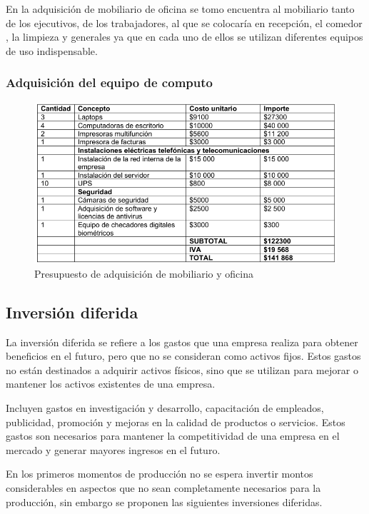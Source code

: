 En la adquisición de mobiliario de oficina se tomo encuentra al mobiliario tanto de los ejecutivos, de los trabajadores, al que se colocaría en recepción, el comedor , la limpieza y generales ya que en cada uno de ellos se utilizan diferentes equipos de uso indispensable. 


\subsubsection{Adquisición del equipo de computo}

\begin{figure}[H]
    \centering	
    \includegraphics[width=1.1\textwidth]{chapters/ELC6.png} 
    \caption{Presupuesto de adquisición de mobiliario y oficina }
\label{fig:croquis190125}
\end{figure}






\subsection{Inversión diferida}
La inversión diferida se refiere a los gastos que una empresa realiza para obtener beneficios en el futuro, pero que no se consideran como activos fijos. Estos gastos no están destinados a adquirir activos físicos, sino que se utilizan para mejorar o mantener los activos existentes de una empresa.

Incluyen gastos en investigación y desarrollo, capacitación de empleados, publicidad, promoción y mejoras en la calidad de productos o servicios. Estos gastos son necesarios para mantener la competitividad de una empresa en el mercado y generar mayores ingresos en el futuro.

En los primeros momentos de producción no se espera invertir montos considerables en aspectos que no sean completamente necesarios para la producción, sin embargo se proponen las siguientes inversiones diferidas.

